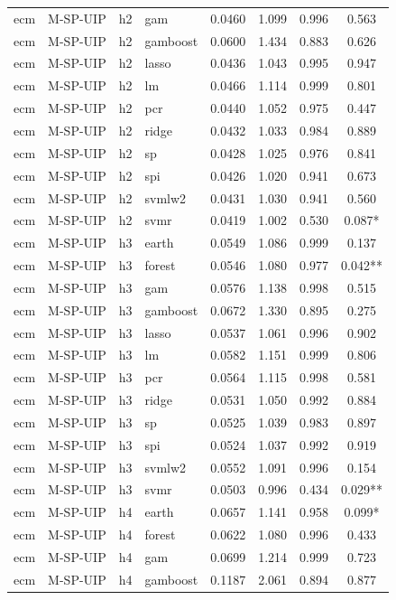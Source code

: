 \begin{ThreePartTable}
\begin{longtable}[t]{llclcccc}
ecm & M-SP-UIP & h2 & gam & 0.0460 & 1.099 & 0.996 & 0.563\\
ecm & M-SP-UIP & h2 & gamboost & 0.0600 & 1.434 & 0.883 & 0.626\\
ecm & M-SP-UIP & h2 & lasso & 0.0436 & 1.043 & 0.995 & 0.947\\
ecm & M-SP-UIP & h2 & lm & 0.0466 & 1.114 & 0.999 & 0.801\\
ecm & M-SP-UIP & h2 & pcr & 0.0440 & 1.052 & 0.975 & 0.447\\
ecm & M-SP-UIP & h2 & ridge & 0.0432 & 1.033 & 0.984 & 0.889\\
ecm & M-SP-UIP & h2 & sp & 0.0428 & 1.025 & 0.976 & 0.841\\
ecm & M-SP-UIP & h2 & spi & 0.0426 & 1.020 & 0.941 & 0.673\\
ecm & M-SP-UIP & h2 & svmlw2 & 0.0431 & 1.030 & 0.941 & 0.560\\
ecm & M-SP-UIP & h2 & svmr & 0.0419 & 1.002 & 0.530 & 0.087*\\
\addlinespace
ecm & M-SP-UIP & h3 & earth & 0.0549 & 1.086 & 0.999 & 0.137\\
ecm & M-SP-UIP & h3 & forest & 0.0546 & 1.080 & 0.977 & 0.042**\\
ecm & M-SP-UIP & h3 & gam & 0.0576 & 1.138 & 0.998 & 0.515\\
ecm & M-SP-UIP & h3 & gamboost & 0.0672 & 1.330 & 0.895 & 0.275\\
ecm & M-SP-UIP & h3 & lasso & 0.0537 & 1.061 & 0.996 & 0.902\\
ecm & M-SP-UIP & h3 & lm & 0.0582 & 1.151 & 0.999 & 0.806\\
ecm & M-SP-UIP & h3 & pcr & 0.0564 & 1.115 & 0.998 & 0.581\\
ecm & M-SP-UIP & h3 & ridge & 0.0531 & 1.050 & 0.992 & 0.884\\
ecm & M-SP-UIP & h3 & sp & 0.0525 & 1.039 & 0.983 & 0.897\\
ecm & M-SP-UIP & h3 & spi & 0.0524 & 1.037 & 0.992 & 0.919\\
ecm & M-SP-UIP & h3 & svmlw2 & 0.0552 & 1.091 & 0.996 & 0.154\\
ecm & M-SP-UIP & h3 & svmr & 0.0503 & 0.996 & 0.434 & 0.029**\\
\addlinespace
ecm & M-SP-UIP & h4 & earth & 0.0657 & 1.141 & 0.958 & 0.099*\\
ecm & M-SP-UIP & h4 & forest & 0.0622 & 1.080 & 0.996 & 0.433\\
ecm & M-SP-UIP & h4 & gam & 0.0699 & 1.214 & 0.999 & 0.723\\
ecm & M-SP-UIP & h4 & gamboost & 0.1187 & 2.061 & 0.894 & 0.877\\

\end{longtable}
\end{ThreePartTable}

